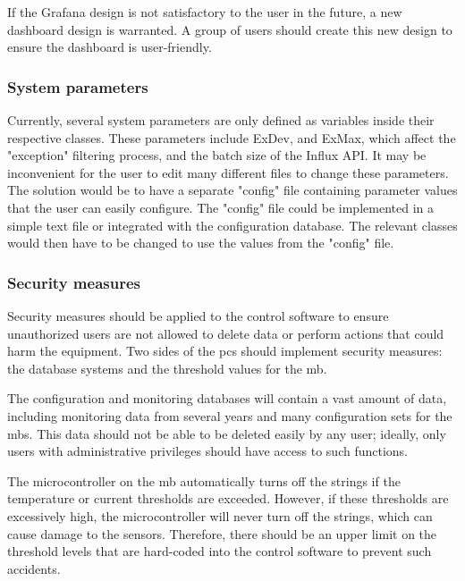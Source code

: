 \documentclass[main.tex]{subfiles}
\begin{document}
If the Grafana design is not satisfactory to the user in the future, a new dashboard design is warranted. A group of users should create this new design to ensure the dashboard is user-friendly.

\subsubsection{System parameters}

Currently, several system parameters are only defined as variables inside their respective classes. These parameters include ExDev, and ExMax, which affect the "exception" filtering process, and the batch size of the Influx API. It may be inconvenient for the user to edit many different files to change these parameters. The solution would be to have a separate "config" file containing parameter values that the user can easily configure. The "config" file could be implemented in a simple text file or integrated with the configuration database. The relevant classes would then have to be changed to use the values from the "config" file.

\subsubsection{Security measures}

Security measures should be applied to the control software to ensure unauthorized users are not allowed to delete data or perform actions that could harm the equipment. Two sides of the \gls{pcs} should implement security measures: the database systems and the threshold values for the \gls{mb}.

The configuration and monitoring databases will contain a vast amount of data, including monitoring data from several years and many configuration sets for the \gls{mb}s. This data should not be able to be deleted easily by any user; ideally, only users with administrative privileges should have access to such functions.

The microcontroller on the \gls{mb} automatically turns off the strings if the temperature or current thresholds are exceeded. However, if these thresholds are excessively high, the microcontroller will never turn off the strings, which can cause damage to the sensors. Therefore, there should be an upper limit on the threshold levels that are hard-coded into the control software to prevent such accidents. 

 
\end{document}
